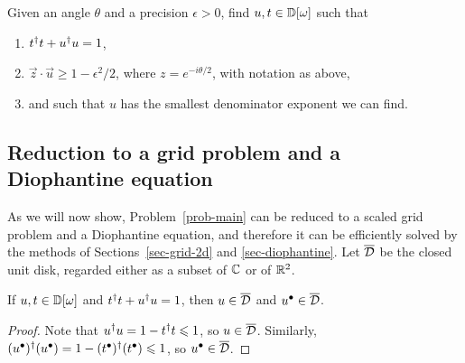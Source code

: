 \documentclass{article}
\begin{document}
\begin{problem}\label{prob-main}
  Given an angle $\theta$ and a precision $\epsilon>0$, find
  $u,t\in{\mathbb{D}}[\omega]$ such that
  \begin{enumerate}\alphalabels
  \item ${t}^{\dagger} t+{u}^{\dagger} u=1$,
  \item $\vec z\cdot \vec u \geq 1 - \epsilon^2/2$, where
    $z=e^{-i\theta/2}$, with notation as above,
  \item and such that $u$ has the smallest denominator exponent we can find.
  \end{enumerate}
\end{problem}

\subsection{Reduction to a grid problem and a Diophantine equation}
\label{ssec-reduction}

As we will now show, Problem~\ref{prob-main} can be reduced to a
scaled grid problem and a Diophantine equation, and therefore it can
be efficiently solved by the methods of Sections~\ref{sec-grid-2d} and
{\ref{sec-diophantine}}. Let $\overline {\cal D}$ be the closed unit disk, regarded
either as a subset of ${\mathbb{C}}$ or of ${\mathbb{R}}^2$.

\begin{lemma}\label{lem-reduction-a}
  If $u,t\in{\mathbb{D}}[\omega]$ and ${t}^{\dagger} {t}+{u}^{\dagger} u=1$, then $u\in\overline {\cal D}$
  and ${u}^{\bullet}\in\overline {\cal D}$.
\end{lemma}

\begin{proof}
  Note that ${u}^{\dagger} u = 1-{t}^{\dagger} t \leqslant 1$, so $u\in\overline {\cal D}$.
  Similarly, $({u}^{\bullet})^{\dagger}({u}^{\bullet}) = 1-({t}^{\bullet})^{\dagger}({t}^{\bullet}) \leqslant 1$,
  so ${u}^{\bullet}\in\overline {\cal D}$.
\end{proof}
\end{document}
